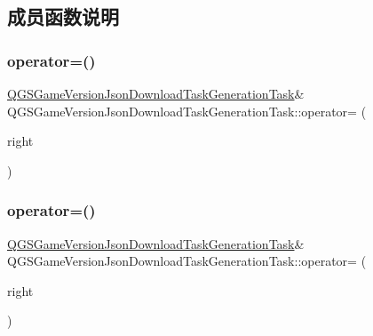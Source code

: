\subsection{成员函数说明}
\mbox{\label{class_q_g_s_game_version_json_download_task_generation_task_a85cde79cf22a0745e31d472b08ba6b98}} 
\subsubsection{\texorpdfstring{operator=()}{operator=()}\hspace{0.1cm}{\footnotesize\ttfamily [1/2]}}
{\footnotesize\ttfamily \mbox{\hyperlink{class_q_g_s_game_version_json_download_task_generation_task}{Q\+G\+S\+Game\+Version\+Json\+Download\+Task\+Generation\+Task}}\& Q\+G\+S\+Game\+Version\+Json\+Download\+Task\+Generation\+Task\+::operator= (\begin{DoxyParamCaption}\item[{const \mbox{\hyperlink{class_q_g_s_game_version_json_download_task_generation_task}{Q\+G\+S\+Game\+Version\+Json\+Download\+Task\+Generation\+Task}} \&}]{right }\end{DoxyParamCaption})\hspace{0.3cm}{\ttfamily [delete]}}

\mbox{\label{class_q_g_s_game_version_json_download_task_generation_task_af5cd4eaffd657cbe7520082beffebaac}} 
\subsubsection{\texorpdfstring{operator=()}{operator=()}\hspace{0.1cm}{\footnotesize\ttfamily [2/2]}}
{\footnotesize\ttfamily \mbox{\hyperlink{class_q_g_s_game_version_json_download_task_generation_task}{Q\+G\+S\+Game\+Version\+Json\+Download\+Task\+Generation\+Task}}\& Q\+G\+S\+Game\+Version\+Json\+Download\+Task\+Generation\+Task\+::operator= (\begin{DoxyParamCaption}\item[{\mbox{\hyperlink{class_q_g_s_game_version_json_download_task_generation_task}{Q\+G\+S\+Game\+Version\+Json\+Download\+Task\+Generation\+Task}} \&\&}]{right }\end{DoxyParamCaption})\hspace{0.3cm}{\ttfamily [delete]}}

